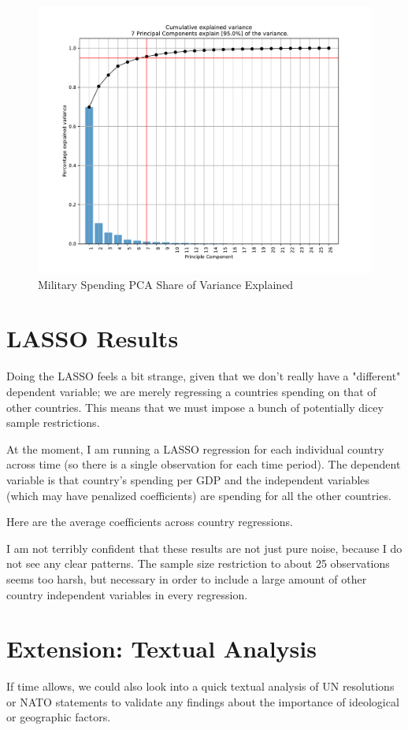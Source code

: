 \documentclass{report}
\begin{document}
	\begin{figure}[h!]
		\centering
		\caption{Military Spending PCA Share of Variance Explained}
		\label{Milex_PC_Share_Explained}	
		\includegraphics[width=\linewidth,keepaspectratio=true]{../Output/Figures/Milex_PC_Share_Explained.pdf}
	\end{figure}

	\newpage \clearpage

	\section*{LASSO Results}

	Doing the LASSO feels a bit strange, given that we don't really have a "different" dependent variable; we are merely regressing a countries spending on that of other countries. This means that we must impose a bunch of potentially dicey sample restrictions. 
	
	At the moment, I am running a LASSO regression for each individual country across time (so there is a single observation for each time period). The dependent variable is that country's spending per GDP and the independent variables (which may have penalized coefficients) are spending for all the other countries.

	Here are the average coefficients across country regressions.

	

	I am not terribly confident that these results are not just pure noise, because I do not see any clear patterns. The sample size restriction to about 25 observations seems too harsh, but necessary in order to include a large amount of other country independent variables in every regression.

	\newpage \clearpage

    \section*{Extension: Textual Analysis}

	If time allows, we could also look into a quick textual analysis of UN resolutions or NATO statements to validate any findings about the importance of ideological or geographic factors.
\end{document}
